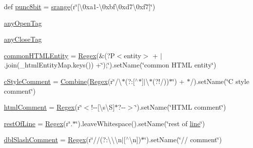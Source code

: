 \begin{DoxyCompactItemize}
\item 
def \hyperlink{namespacepkg__resources_1_1__vendor_1_1pyparsing_ab9cb018cd81c5437eac095371d845b2c}{punc8bit} = \hyperlink{namespacepkg__resources_1_1__vendor_1_1pyparsing_a027169ca2662651f3eb417e3f81e4db6}{srange}(r\char`\"{}\mbox{[}\textbackslash{}0xa1-\/\textbackslash{}0xbf\textbackslash{}0xd7\textbackslash{}0xf7\mbox{]}\char`\"{})
\item 
\hyperlink{namespacepkg__resources_1_1__vendor_1_1pyparsing_a9df3324662e233e0d1dbda0ca4406b16}{any\+Open\+Tag}
\item 
\hyperlink{namespacepkg__resources_1_1__vendor_1_1pyparsing_af51faf1dc894af5ce35ff013b4a0b52f}{any\+Close\+Tag}
\item 
\hyperlink{namespacepkg__resources_1_1__vendor_1_1pyparsing_aec9dcadfedc632794055e04875c7e014}{common\+H\+T\+M\+L\+Entity} = \hyperlink{classpkg__resources_1_1__vendor_1_1pyparsing_1_1_regex}{Regex}(\textquotesingle{}\&(?P$<$entity$>$\textquotesingle{} + \textquotesingle{}$\vert$\textquotesingle{}.join(\+\_\+html\+Entity\+Map.\+keys()) +\char`\"{});\char`\"{}).set\+Name(\char`\"{}common H\+T\+ML entity\char`\"{})
\item 
\hyperlink{namespacepkg__resources_1_1__vendor_1_1pyparsing_a74086d89897152955bf3ceb8a2957839}{c\+Style\+Comment} = \hyperlink{classpkg__resources_1_1__vendor_1_1pyparsing_1_1_combine}{Combine}(\hyperlink{classpkg__resources_1_1__vendor_1_1pyparsing_1_1_regex}{Regex}(r\char`\"{}/\textbackslash{}$\ast$(?\+:\mbox{[}$^\wedge$$\ast$\mbox{]}$\vert$\textbackslash{}$\ast$(?!/))$\ast$\char`\"{}) + \textquotesingle{}$\ast$/\textquotesingle{}).set\+Name(\char`\"{}C style comment\char`\"{})
\item 
\hyperlink{namespacepkg__resources_1_1__vendor_1_1pyparsing_af72156d99942d7f614e690d96fe98b1d}{html\+Comment} = \hyperlink{classpkg__resources_1_1__vendor_1_1pyparsing_1_1_regex}{Regex}(r\char`\"{}$<$!-\/-\/\mbox{[}\textbackslash{}s\textbackslash{}S\mbox{]}$\ast$?-\/-\/$>$\char`\"{}).set\+Name(\char`\"{}H\+T\+ML comment\char`\"{})
\item 
\hyperlink{namespacepkg__resources_1_1__vendor_1_1pyparsing_a3eec07dfa8cbeccb6b1997229dda670e}{rest\+Of\+Line} = \hyperlink{classpkg__resources_1_1__vendor_1_1pyparsing_1_1_regex}{Regex}(r\char`\"{}.$\ast$\char`\"{}).leave\+Whitespace().set\+Name(\char`\"{}rest of \hyperlink{namespacepkg__resources_1_1__vendor_1_1pyparsing_a2b9d7cf674162311ae0dfa5938ef17d6}{line}\char`\"{})
\item 
\hyperlink{namespacepkg__resources_1_1__vendor_1_1pyparsing_a34bf2e5bf5b46d3d0c785fd95b111022}{dbl\+Slash\+Comment} = \hyperlink{classpkg__resources_1_1__vendor_1_1pyparsing_1_1_regex}{Regex}(r\char`\"{}//(?\+:\textbackslash{}\textbackslash{}\textbackslash{}n$\vert$\mbox{[}$^\wedge$\textbackslash{}n\mbox{]})$\ast$\char`\"{}).set\+Name(\char`\"{}// comment\char`\"{})
$$
\end{DoxyCompactItemize}
